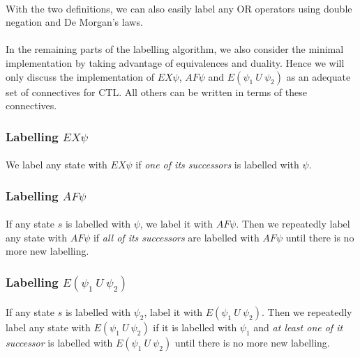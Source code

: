 \documentclass{article}
\theoremstyle{plain}
\theoremstyle{definition}
\begin{document}
\begin{multicols}{2}
\paragraph{} With the two definitions, we can also easily label any OR operators using double negation and De Morgan's laws.

\paragraph{} In the remaining parts of the labelling algorithm, we also consider the minimal implementation by taking advantage of equivalences and duality. Hence we will only discuss the implementation of $EX\psi$, $AF\psi$ and $E(\psi_1\ U\ \psi_2)$ as an adequate set of connectives for CTL. All others can be written in terms of these connectives.

\subsubsection{Labelling $EX\psi$}

\paragraph{} We label any state with $EX\psi$ if \textit{one of its successors} is labelled with $\psi$.

\subsubsection{Labelling $AF\psi$}

\paragraph{} If any state $s$ is labelled with $\psi$, we label it with $AF\psi$. Then we repeatedly label any state with $AF\psi$ if \textit{all of its successors} are labelled with $AF\psi$ until there is no more new labelling.

\subsubsection{Labelling $E(\psi_1\ U\ \psi_2)$}

\paragraph{} If any state $s$ is labelled with $\psi_2$, label it with $E(\psi_1\ U\ \psi_2)$. Then we repeatedly label any state with $E(\psi_1\ U\ \psi_2)$ if it is labelled with $\psi_1$ and \textit{at least one of it successor} is labelled with $E(\psi_1\ U\ \psi_2)$ until there is no more new labelling.


\end{multicols}
\end{document}
